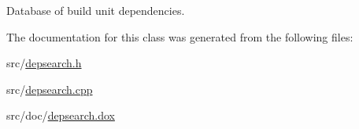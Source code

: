 Database of build unit dependencies. 



The documentation for this class was generated from the following files\-:\begin{DoxyCompactItemize}
\item 
src/\hyperlink{depsearch_8h}{depsearch.\-h}\item 
src/\hyperlink{depsearch_8cpp}{depsearch.\-cpp}\item 
src/doc/\hyperlink{depsearch_8dox}{depsearch.\-dox}\end{DoxyCompactItemize}
